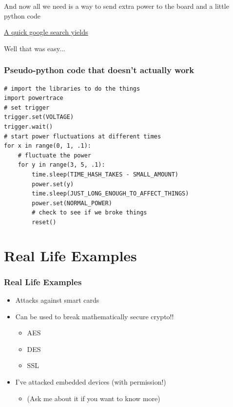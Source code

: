 \documentclass{beamer}
\begin{document}
\begin{frame}
    \begin{center}And now all we need is a way to send extra power to the board and a little python code\end{center}
\end{frame}

\begin{frame}
    \begin{center}\underline{\href{https://github.com/amuramatsu/dwf/tree/master/examples}{A quick google search yields}}\end{center}
\end{frame}

\begin{frame}
    \begin{center}Well that was easy...\end{center}
\end{frame}

\begin{frame}[fragile]
\frametitle{Pseudo-python code that doesn't actually work}
\lstset{language=Python}
\begin{lstlisting}
# import the libraries to do the things
import powertrace
# set trigger
trigger.set(VOLTAGE)
trigger.wait()
# start power fluctuations at different times
for x in range(0, 1, .1):
    # fluctuate the power
    for y in range(3, 5, .1):
        time.sleep(TIME_HASH_TAKES - SMALL_AMOUNT)
        power.set(y)
        time.sleep(JUST_LONG_ENOUGH_TO_AFFECT_THINGS)
        power.set(NORMAL_POWER)
        # check to see if we broke things
        reset()
\end{lstlisting}

\end{frame}

\section{Real Life Examples}

\begin{frame}[t]
\frametitle{Real Life Examples}
\begin{itemize}
    \item Attacks against smart cards
    \item Can be used to break mathematically secure crypto!!
        \begin{itemize}
        \item AES
        \item DES
        \item SSL
        \end{itemize}
    \item I've attacked embedded devices (with permission!)
        \begin{itemize}
            \item (Ask me about it if you want to know more)
        \end{itemize}
\end{itemize}
\end{frame}
\end{document}
